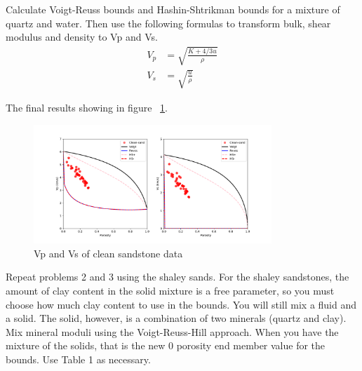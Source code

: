 \begin{solution}

    Calculate Voigt-Reuss bounds and Hashin-Shtrikman bounds for a mixture of quartz and water.
    Then use the following formulas to transform bulk, shear modulus and density to Vp and Vs.
    \begin{align}
        V_p & = \sqrt{\frac{K+ 4/3 u}{\rho} } \\
        V_s & =  \sqrt{\frac{u}{\rho} }
        \label{equ:Vp-Vs}
    \end{align}
    
    The final results showing in figure ~\ref{fig:p1-problem-3}.
    \begin{figure}[h]
        \centering
        \includegraphics[width=0.8\textwidth]{figures/homework-1/p1-problem-3.pdf}
        \caption{Vp and Vs of clean sandstone data}
        \label{fig:p1-problem-3}
    \end{figure}
\end{solution}



\begin{problem}{4}
    Repeat problems 2 and 3 using the shaley sands. For the shaley sandstones, the amount of clay content in the solid mixture is a free parameter, so you must choose how much clay content to use in the bounds. You will still mix a fluid and a solid. The solid, however, is a combination of two minerals (quartz and clay). Mix mineral moduli using the Voigt-Reuss-Hill approach. When you have the mixture of the solids, that is the new 0 porosity end member value for the bounds. Use Table 1 as necessary.
\end{problem}


